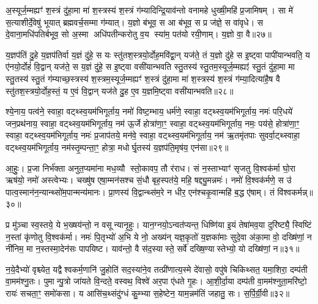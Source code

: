 अ॒स्यूर्ज॒म्मह्यꣳ॑ श॒स्त्रं दु॑हा॒मा मा॑ श॒स्त्रस्य॑ श॒स्त्रं ग॑म्यादिन्द्रि॒याव॑न्तो वनामहे धुख्षी॒महि॑ प्र॒जामिषम्। सा मे॑ स॒त्याशीर्दे॒वेषु॑ भूयात् ब्रह्मवर्च॒सम्मा ग॑म्यात्। य॒ज्ञो ब॑भूव॒ स आ ब॑भूव॒ स प्र ज॑ज्ञे॒ स वा॑वृधे। स दे॒वाना॒मधि॑पतिर्बभूव॒ सो अ॒स्मा अधि॑पतीन्करोतु व॒य स्या॑म॒ पत॑यो रयी॒णाम्। य॒ज्ञो वा॒ वै॥२७॥

य॒ज्ञप॑तिं दु॒हे य॒ज्ञप॑तिर्वा य॒ज्ञं दु॑हे॒ स यः स्तु॑तश॒स्त्रयो॒र्दोह॒मवि॑द्वा॒न् यज॑ते॒ तं य॒ज्ञो दु॑हे स इ॒ष्ट्वा पापी॑यान्भवति॒ य ए॑नयो॒र्दोहं॑ वि॒द्वान् यज॑ते॒ स य॒ज्ञं दु॑हे॒ स इ॒ष्ट्वा वसी॑यान्भवति स्तु॒तस्य॑ स्तु॒तम॒स्यूर्ज॒म्मह्यꣵ॑ स्तु॒तं दु॑हा॒मा मा स्तु॒तस्य॑ स्तु॒तं ग॑म्याच्छ॒स्त्रस्य॑ श॒स्त्रम॒स्यूर्ज॒म्मह्यꣳ॑ श॒स्त्रं दु॑हा॒मा मा॑ श॒स्त्रस्य॑ श॒स्त्रं ग॑म्या॒दित्या॑है॒ष वै स्तु॑तश॒स्त्रयो॒र्दोह॒स्तं॒ य ए॒वं वि॒द्वान् यज॑ते दु॒ह ए॒व य॒ज्ञमि॒ष्ट्वा वसी॑यान्भवति॥२८॥

{\anuvakamend[{श॒स्त्रं वै श॒स्त्रन्दु॑हा॒न्द्वाविꣳ॑शतिश्च॥७॥}]}

श्ये॒नाय॒ पत्व॑ने॒ स्वाहा॒ वट्थ्स्व॒यम॑भिगूर्ताय॒ नमो॑ विष्ट॒म्भाय॒ धर्म॑णे॒ स्वाहा॒ वट्थ्स्व॒यम॑भिगूर्ताय॒ नमः॑ परि॒धये॑ जन॒प्रथ॑नाय॒ स्वाहा॒ वट्थ्स्व॒यम॑भिगूर्ताय॒ नम॑ ऊ॒र्जे होत्रा॑णा॒ꣳ॒ स्वाहा॒ वट्थ्स्व॒यम॑भिगूर्ताय॒ नमः॒ पय॑से॒ होत्रा॑णा॒ꣳ॒ स्वाहा॒ वट्थ्स्व॒यम॑भिगूर्ताय॒ नमः॑ प्र॒जाप॑तये॒ मन॑वे॒ स्वाहा॒ वट्थ्स्व॒यम॑भिगूर्ताय॒ नम॑ ऋ॒तमृ॑तपाः सुवर्वा॒ट्थ्स्वाहा॒ वट्थ्स्व॒यम॑भिगूर्ताय॒ नम॑स्तृ॒म्पन्ता॒ꣳ॒ होत्रा॒ मधोर्घृ॒तस्य॑ य॒ज्ञप॑ति॒मृष॑य॒ एन॑सा॥२९॥

आ॒हुः॒। प्र॒जा निर्भ॑क्ता अनुत॒प्यमा॑ना मध॒व्यौ स्तो॒कावप॒ तौ र॑राध। सं न॒स्ताभ्याꣳ॑ सृजतु वि॒श्वक॑र्मा घो॒रा ऋष॑यो॒ नमो॑ अस्त्वेभ्यः। चख्षु॑ष एषा॒म्मन॑सश्च सं॒धौ बृह॒स्पत॑ये॒ महि॒ षद्द्यु॒मन्नमः॑। नमो॑ वि॒श्वक॑र्मणे॒ स उ॑ पात्व॒स्मान॑न॒न्यान्थ्सो॑म॒पान्मन्य॑मानः। प्रा॒णस्य॑ वि॒द्वान्थ्स॑म॒रे न धीर॒ एन॑श्चकृ॒वान्महि॑ ब॒द्ध ए॑षाम्। तं वि॑श्वकर्मन्न्॥३०॥

प्र मु॑ञ्चा स्व॒स्तये॒ ये भ॒ख्षय॑न्तो॒ न वसून्यानृ॒हुः। यान॒ग्नयो॒ऽन्वत॑प्यन्त॒ धिष्णि॑या इ॒यं तेषा॑मव॒या दुरि॑ष्ट्यै॒ स्विष्टिं न॒स्तां कृ॑णोतु वि॒श्वक॑र्मा। नमः॑ पि॒तृभ्यो॑ अ॒भि ये नो॒ अख्य॑न् यज्ञ॒कृतो॑ य॒ज्ञका॑माः सुदे॒वा अ॑का॒मा वो॒ दख्षि॑णां॒ न नी॑निम॒ मा न॒स्तस्मा॒देन॑सः पापयिष्ट। याव॑न्तो॒ वै स॑द॒स्यास्ते॒ सर्वे॑ दख्षि॒ण्यास्तेभ्यो॒ यो दख्षि॑णां॒ न॥३१॥

न॒ये॒दैभ्यो॑ वृश्च्येत॒ यद्वैश्वकर्म॒णानि॑ जु॒होति॑ सद॒स्या॑ने॒व तत्प्री॑णात्य॒स्मे दे॑वासो॒ वपु॑षे चिकिथ्सत॒ यमा॒शिरा॒ दम्प॑ती वा॒मम॑श्नु॒तः। पुमान्पु॒त्रो जा॑यते वि॒न्दते॒ वस्वथ॒ विश्वे॑ अर॒पा ए॑धते गृ॒हः। आ॒शी॒र्दा॒या दम्प॑ती वा॒मम॑श्नुता॒मरि॑ष्टो॒ रायः॑ सचता॒ꣳ॒ समो॑कसा। य आसि॑च॒थ्संदु॑ग्धं कु॒म्भ्या स॒हेष्टेन॒ याम॒न्नम॑तिं जहातु॒ सः। स॒र्पि॒र्ग्री॒वी॥३२॥


